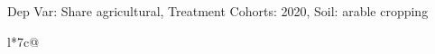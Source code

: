 \begin{table}[H]
\captionlistentry[table]{}
\label{table:beaver_land_class_DVis_land_class_1_SCg3_SSAC}
\scriptsize %
Dep Var: Share agricultural, Treatment Cohorts: 2020, Soil: arable cropping \\
\begin{threeparttable}
\begin{tabulary}{\textwidth}{l*{7}{c}@{}}
\toprule \toprule
\noalign{\smallskip}
\noalign{\smallskip}
\midrule \bottomrule
\end{tabulary}
\medskip
\end{threeparttable}
\end{table}
